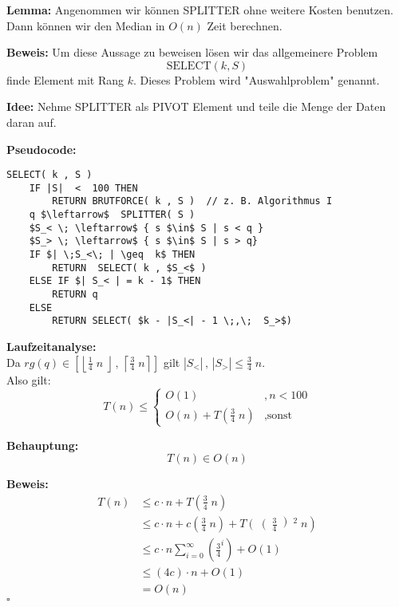 \begin{description}

\item{\bfseries Lemma:} Angenommen wir können SPLITTER ohne weitere Kosten benutzen. Dann können wir den Median in $O (n)$ Zeit berechnen.

\item{\bfseries Beweis:} Um diese Aussage zu beweisen lösen wir das allgemeinere Problem
$$\text{SELECT}(k,S)$$
finde Element mit Rang $k$.
\vspace{\baselineskip}
Dieses Problem wird "Auswahlproblem" genannt.

\item{\bfseries Idee:} Nehme SPLITTER als PIVOT Element und teile die Menge der Daten daran auf.

\pagebreak

\item{\bfseries Pseudocode:}


\begin{lstlisting}
SELECT( k , S )
	IF |S|  <  100 THEN
		RETURN BRUTFORCE( k , S )  // z. B. Algorithmus I
	q $\leftarrow$  SPLITTER( S )
	$S_< \; \leftarrow$ { s $\in$ S | s < q }
	$S_> \; \leftarrow$ { s $\in$ S | s > q}
	IF $| \;S_<\; | \geq  k$ THEN
		RETURN  SELECT( k , $S_<$ )
	ELSE IF $| S_< | = k - 1$ THEN
		RETURN q
	ELSE
		RETURN SELECT( $k - |S_<| - 1 \;,\;  S_>$)
\end{lstlisting}

\item{\bfseries Laufzeitanalyse:} \\ Da $rg(q) \in \left[\left\lfloor \frac{1}{4}\;n\;\right\rfloor\, , \, \left\lceil \frac{3}{4} \; n \right\rceil \right]$ gilt $\left| S_< \right| \, , \, \left| S_> \right| \leq \frac{3}{4} \; n$.\\
\vspace{\baselineskip}
Also gilt:
$$T(n) \leq \left\{ \begin{array}{lr} O(1) & , n < 100 \\ O(n) + T\left( \frac{3}{4} \; n\right) & ,\text{sonst} \end{array}\right. $$

\begin{description}

\item{\bfseries Behauptung:} $$T(n) \in O(n)$$

\item{\bfseries Beweis:}
$$
\begin{array}{rl}
T(n) & \leq c\cdot n + T\left( \frac{3}{4} \;n \right) \\
& \leq c \cdot n + c\left( \frac{3}{4} \;n \right) + T \left( \right(\frac{3}{4}\left)^2 \;n \right) \\
& \leq c\cdot n \sum_{i=0}^{\infty} \left( \frac{3}{4}^i \right) + O(1)\\
& \leq (4c)\cdot n + O(1)\\
&= O(n)
\end{array}
$$
\mbox{}\hfill $\square$
\end{description}


\end{description}
